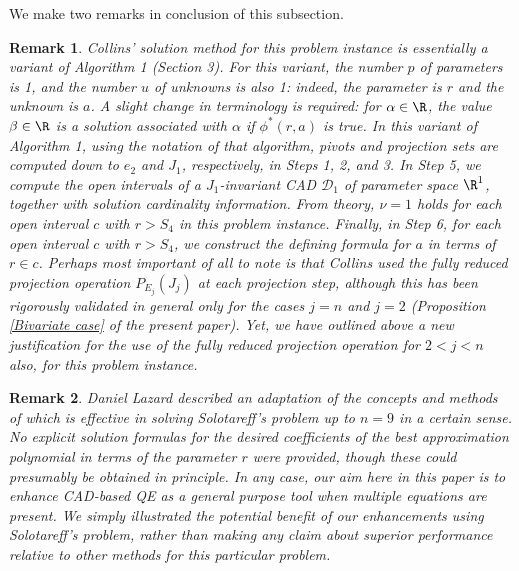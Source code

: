 \documentclass{article}
\newtheorem{remark}{Remark}
\begin{document}
We make two remarks in conclusion of this subsection.

\begin{remark}
    Collins' solution method for this problem instance is 
    essentially a variant of Algorithm 1 (Section 3).
    For this variant, the number $p$ of parameters is 1,
    and the number $u$ of unknowns is also 1: indeed, the parameter
    is $r$ and the unknown is $a$. A slight change in terminology
    is required: for $\alpha \in \R$, the value $\beta \in \R$ 
    is a solution associated with $\alpha$ if $\phi^*(r,a)$ is true.
    In this variant of Algorithm 1,
    using the notation of that algorithm, pivots and projection sets
    are computed down to $e_2$ and $J_1$, respectively, in Steps 1, 2,
    and 3. In Step 5, we compute the open intervals of a $J_1$-invariant
    CAD $\mathcal{D}_1$ of parameter space $\R^1$, 
    together with solution cardinality
    information. From theory, $\nu = 1$ holds for
    each open interval $c$ with $r > S_4$ in this problem
    instance. Finally, in Step 6, for each open interval $c$ with
    $r > S_4$, we construct the defining formula for $a$ 
    in terms of $r \in c$.
    Perhaps most important of all to note is that Collins
    \cite{Collins1996, Collins1998} used the fully reduced projection
    operation $P_{E_j}(J_j)$ at each projection step,
    although this has been rigorously validated 
    in general only for the cases
    $j = n$ \cite{McCallum1999} and $j = 2$ 
    (Proposition \ref{Bivariate case} of the present paper).
    Yet, we have outlined above a new justification 
    for the use of the fully reduced projection operation
    for $2 < j < n$ also, for this problem instance.
\end{remark}

\begin{remark}
    Daniel Lazard \cite{Lazard2006} described an adaptation of the
    concepts and methods of \cite{LR07} which is effective in
    solving Solotareff's problem up to $n = 9$ in a certain sense.
    No explicit solution formulas for the desired coefficients of the
    best approximation polynomial in terms of the parameter $r$
    were provided, though these could presumably be obtained in
    principle. In any case, our aim here in this paper is to enhance
    CAD-based QE as a general purpose tool when multiple equations are 
    present. We simply illustrated the potential benefit of our
    enhancements using Solotareff's problem, rather than making
    any claim about superior performance relative to other methods
    for this particular problem.
\end{remark}
\end{document}
